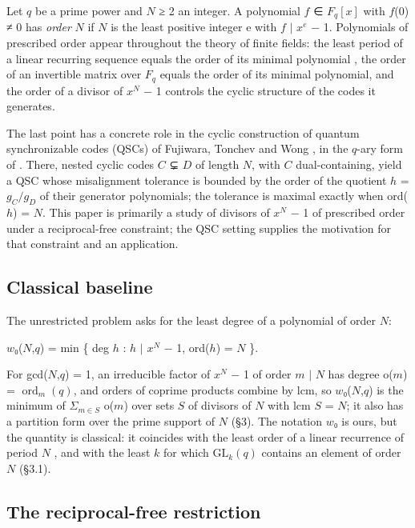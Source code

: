 \documentclass[pdflatex,sn-mathphys-num]{sn-jnl}
\theoremstyle{thmstyleone}
\theoremstyle{thmstylethree}
\begin{document}
Let \(q\) be a prime power and \(N\) ≥ 2 an integer. A polynomial \(f\) ∈ \(F_q[x]\) with \(f\)(0) ≠ 0 has \emph{order} \(N\) if \(N\) is the least positive integer e with \(f\) \(\mid\) \(x^e\) − 1. Polynomials of prescribed order appear throughout the theory of finite fields: the least period of a linear recurring sequence equals the order of its minimal polynomial \cite{LN}, the order of an invertible matrix over \(F_q\) equals the order of its minimal polynomial, and the order of a divisor of \(x^N\) − 1 controls the cyclic structure of the codes it generates.

The last point has a concrete role in the cyclic construction of quantum synchronizable codes (QSCs) of Fujiwara, Tonchev and Wong \cite{FTW}, in the \(q\)-ary form of \cite{XYY16,LM18}. There, nested cyclic codes \(C\) ⊊ \(D\) of length \(N\), with \(C\) dual-containing, yield a QSC whose misalignment tolerance is bounded by the order of the quotient \(h\) = \(g_C/g_D\) of their generator polynomials; the tolerance is maximal exactly when ord(\(h\)) = \(N\). This paper is primarily a study of divisors of \(x^N\) − 1 of prescribed order under a reciprocal-free constraint; the QSC setting supplies the motivation for that constraint and an application.

\subsection{Classical baseline}

The unrestricted problem asks for the least degree of a polynomial of order \(N\):

\begin{center}\(w\)₀(\(N\),\(q\)) = min \{ deg \(h\) : \(h\) \(\mid\) \(x^N\) − 1, ord(\(h\)) = \(N\) \}.\end{center}

For gcd(\(N\),\(q\)) = 1, an irreducible factor of \(x^N\) − 1 of order \(m\) \(\mid\) \(N\) has degree o(\(m\)) = \(\operatorname{ord}_m(q)\), and orders of coprime products combine by lcm, so \(w\)₀(\(N\),\(q\)) is the minimum of \(Σ_{m∈S}\) o(\(m\)) over sets \(S\) of divisors of \(N\) with lcm \(S\) = \(N\); it also has a partition form over the prime support of \(N\) (§3). The notation \(w\)₀ is ours, but the quantity is classical: it coincides with the least order of a linear recurrence of period \(N\) \cite{LN,BQ}, and with the least \(k\) for which \(\mathrm{GL}_k(q)\) contains an element of order \(N\) (§3.1).

\subsection{The reciprocal-free restriction}
\end{document}
